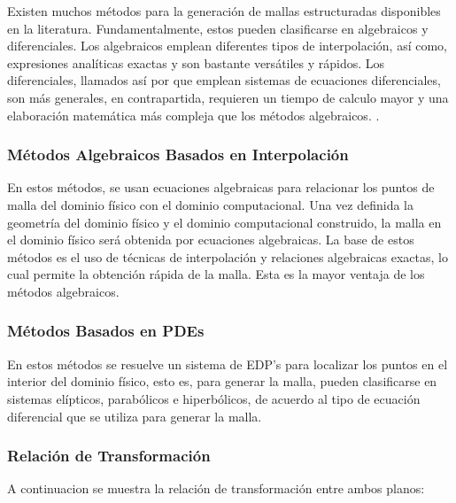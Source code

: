 \documentclass[11pt,letterpaper]{article}
\begin{document}
Existen muchos métodos para la generación de mallas estructuradas disponibles en la literatura. Fundamentalmente, estos pueden clasificarse en algebraicos y diferenciales. Los algebraicos emplean diferentes tipos de interpolación, así como, expresiones analíticas exactas y son bastante versátiles y rápidos. Los diferenciales, llamados así por que emplean sistemas de ecuaciones diferenciales, son más generales, en contrapartida, requieren un tiempo de calculo mayor y una elaboración matemática más compleja que los métodos algebraicos. 
.

\subsubsection{Métodos Algebraicos Basados en Interpolación}
En estos m\'etodos, se usan ecuaciones algebraicas para relacionar los puntos de malla del dominio f\'isico con el dominio computacional. Una vez definida la geometr\'ia del dominio f\'isico y el dominio computacional construido, la malla en el dominio físico será obtenida por ecuaciones algebraicas. La base de estos m\'etodos es el uso de t\'ecnicas de interpolaci\'on y relaciones algebraicas exactas, lo cual permite la obtenci\'on r\'apida de la malla. Esta es la mayor ventaja de los m\'etodos algebraicos. 	
		\\

\subsubsection{Métodos Basados en PDEs}
En estos métodos se resuelve un sistema de EDP's para localizar los puntos en el interior del dominio físico, esto es, para generar la malla, pueden clasificarse en sistemas elípticos, parabólicos e hiperbólicos, de acuerdo al tipo de ecuación diferencial que se utiliza para generar la malla.\\

\subsubsection{Relación de Transformaci\'on}
A continuacion se muestra la relaci\'on de transformaci\'on entre ambos planos:
\end{document}
